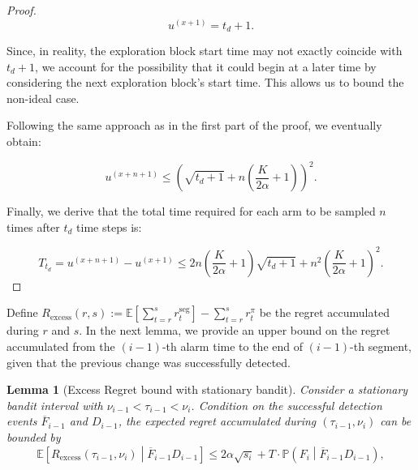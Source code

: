 \documentclass[twoside]{article}
\newcommand{\E}{\mathbb{E}}
\theoremstyle{plain}
\newtheorem{lemma}[theorem]{Lemma}
\theoremstyle{definition}
\theoremstyle{remark}
\begin{document}
\begin{proof}
    \begin{equation}
    u^{(x+1)} = t_d + 1.
    \end{equation}
    
    Since, in reality, the exploration block start time may not exactly coincide with \(t_d + 1\), we account for the possibility that it could begin at a later time by considering the next exploration block's start time. This allows us to bound the non-ideal case.
    
    Following the same approach as in the first part of the proof, we eventually obtain:
    
    \begin{equation}
    u^{(x+n+1)} \leq \left( \sqrt{t_d + 1} + n\left(\frac{K}{2\alpha} + 1\right) \right)^2.
    \end{equation}
    
    Finally, we derive that the total time required for each arm to be sampled \(n\) times after \(t_d\) time steps is:
    
    \begin{equation}
    T_{t_d} = u^{(x+n+1)} - u^{(x+1)} \leq 2n\left( \frac{K}{2\alpha} + 1 \right) \sqrt{t_d + 1} + n^2 \left( \frac{K}{2\alpha} + 1 \right)^2.
    \end{equation}


\end{proof}

Define $R_{\mathrm{excess}}(r,s):=\E[\textstyle\sum_{t=r}^s r_t^{\mathrm{seg}}]-\textstyle\sum_{t=r}^s r_t^{\pi}$ be the regret accumulated during $r$ and $s$. In the next lemma, we provide an upper bound on the regret accumulated from the $\left(i-1\right)$-th alarm time to the end of $\left(i-1\right)$-th segment, given that the previous change was successfully detected.

\begin{lemma}[Excess Regret bound with stationary bandit]\label{applemma:excess_regret_stat} 
Consider a stationary bandit interval with $\nu_{i-1}<\tau_{i-1}<\nu_{i}$. Condition on the successful detection events $\overline{F}_{i-1}$ and $D_{i-1}$, the expected regret accumulated during $\left(\tau_{i-1},\nu_{i}\right)$ can be bounded by
\begin{equation}
    \E\left[R_{\mathrm{excess}}\left(\tau_{i-1},\nu_{i}\right)\middle|\overline{F}_{i-1}D_{i-1} \right]\leq 2\alpha\sqrt{s_{i}}+T\cdot \mathbb{P}\left(F_{i}\middle|\overline{F}_{i-1}D_{i-1}\right),\label{eqn:one_seg_regret}
\end{equation}
\end{lemma}
\end{document}
